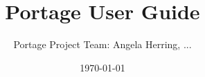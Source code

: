 \iffalse
This file is part of the Ristra portage project.
Please see the license file at the root of this repository, or at:
    https://github.com/laristra/portage/blob/master/LICENSE
\fi




\title{Portage User Guide}
\date{\today}
\author{Portage Project Team: Angela Herring, ...}

